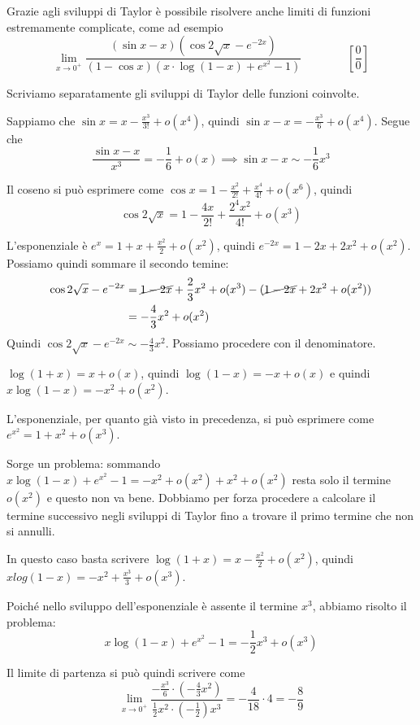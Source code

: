 \begin{example}
Grazie agli sviluppi di Taylor è possibile risolvere anche limiti di funzioni estremamente complicate, come ad esempio
\begin{equation*}
\lim_{x \to 0^+} \frac{(\sin x - x)(\cos 2 \sqrt{x} - e^{-2x})}{(1-\cos x)(x \cdot \log(1-x) + e^{x^2} - 1)} \qquad \qquad \left[\frac{0}{0}\right]
\end{equation*}

Scriviamo separatamente gli sviluppi di Taylor delle funzioni coinvolte.

Sappiamo che $\sin x = x - \frac{x^3}{3!} + o(x^4)$, quindi $\sin x - x = -\frac{x^3}{6} + o(x^4)$. Segue che
\begin{equation*}
\frac{\sin x - x}{x^3} = -\frac{1}{6} + o(x) \implies \sin x - x \sim -\frac{1}{6}x^3
\end{equation*}

Il coseno si può esprimere come $\cos x  = 1 - \frac{x^2}{2!} + \frac{x^4}{4!} + o(x^6)$, quindi
\begin{equation*}
\cos 2\sqrt{x} = 1 - \frac{4x}{2!} + \frac{2^4x^2}{4!} + o(x^3)
\end{equation*}

L'esponenziale è $e^x = 1 + x + \frac{x^2}{2} + o(x^2)$, quindi $e^{-2x} = 1 - 2x + 2x^2 + o(x^2)$. Possiamo quindi sommare il secondo temine:
\begin{align*}
\cos 2\sqrt{x} - e^{-2x} &= \cancel{1 - 2x} + \frac{2}{3}x^2 + o(x^3) - (\cancel{1-2x}+2x^2 + o(x^2)) \\
&= -\frac{4}{3}x^2 + o(x^2)
\end{align*}
Quindi $\cos 2\sqrt{x} - e^{-2x} \sim -\frac{4}{3}x^2$. Possiamo procedere con il denominatore.

$\log(1+x) = x +o(x)$, quindi $\log(1-x) = -x +o(x)$ e quindi $x\log(1-x) = -x^2 +o(x^2)$.

L'esponenziale, per quanto già visto in precedenza, si può esprimere come $e^{x^2} = 1 + x^2 + o(x^3)$.

Sorge un problema: sommando $x\log(1-x)+e^{x^2}-1 = -x^2 + o(x^2) + x^2 + o(x^2)$ resta solo il termine $o(x^2)$ e questo non va bene. Dobbiamo per forza procedere a calcolare il termine successivo negli sviluppi di Taylor fino a trovare il primo termine che non si annulli.

In questo caso basta scrivere $\log(1+x) = x-\frac{x^2}{2}+o(x^2)$, quindi $xlog(1-x) = -x^2+\frac{x^3}{3}+o(x^3)$.

Poiché nello sviluppo dell'esponenziale è assente il termine $x^3$, abbiamo risolto il problema:
\begin{equation*}
x\log(1-x)+e^{x^2}-1 = -\frac{1}{2}x^3 + o(x^3)
\end{equation*}

Il limite di partenza si può quindi scrivere come
\begin{equation*}
\lim_{x \to 0^+} \frac{-\frac{x^3}{6} \cdot \left(-\frac{4}{3}x^2\right)}{\frac{1}{2}x^2 \cdot \left(-\frac{1}{2}\right)x^3} = -\frac{4}{18} \cdot 4 = -\frac{8}{9}
\end{equation*}
\end{example}

